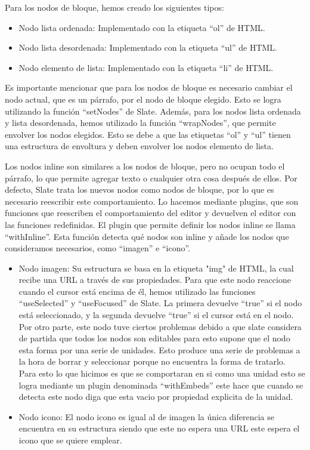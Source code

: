 Para los nodos de bloque, hemos creado los siguientes tipos:

\begin{itemize}
  \item Nodo lista ordenada: Implementado con la etiqueta ``ol'' de HTML.
  \item Nodo lista desordenada: Implementado con la etiqueta ``ul'' de HTML.
  \item Nodo elemento de lista: Implementado con la etiqueta ``li'' de HTML.
\end{itemize}
Es importante mencionar que para los nodos de bloque es necesario cambiar el nodo actual, que es un párrafo, por el nodo de bloque elegido. Esto se logra utilizando la función ``setNodes'' de Slate. Además, para los nodos lista ordenada y lista desordenada, hemos utilizado la función ``wrapNodes'', que permite envolver los nodos elegidos. Esto se debe a que las etiquetas ``ol'' y ``ul'' tienen una estructura de envoltura y deben envolver los nodos elemento de lista.

Los nodos inline son similares a los nodos de bloque, pero no ocupan todo el párrafo, lo que permite agregar texto o cualquier otra cosa después de ellos. Por defecto, Slate trata los nuevos nodos como nodos de bloque, por lo que es necesario reescribir este comportamiento. Lo hacemos mediante plugins, que son funciones que reescriben el comportamiento del editor y devuelven el editor con las funciones redefinidas. El plugin que permite definir los nodos inline se llama ``withInline''. Esta función detecta qué nodos son inline y añade los nodos que consideramos necesarios, como ``imagen'' e ``icono''.
\begin{itemize}
  \item Nodo imagen: Su estructura se basa en la etiqueta "img" de HTML, la cual recibe una URL a través de sus propiedades. Para que este nodo reaccione cuando el cursor está encima de él, hemos utilizado las funciones ``useSelected'' y ``useFocused'' de Slate. La primera devuelve ``true'' si el nodo está seleccionado, y la segunda devuelve ``true'' si el cursor está en el nodo. Por otro parte, este nodo tuve ciertos problemas debido a que slate considera de partida que todos los nodos son editables para esto supone que el nodo esta forma por una serie de unidades. Esto produce una serie de problemas a la hora de borrar y seleccionar porque no encuentra la forma de tratarlo. Para esto lo que hicimos es que se comportaran en si como una unidad esto se logra mediante un plugin denominada ``withEmbeds'' este hace que cuando se detecta este nodo diga que esta vacio por
        propiedad explicita de la unidad.
  \item Nodo icono: El nodo icono es igual al de imagen la única diferencia se encuentra en su estructura siendo que este no espera una URL este espera el icono que se quiere emplear.
\end{itemize}

